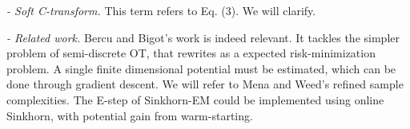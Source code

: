 \documentclass{article}
\begin{document}
\textit{- Soft C-transform.} This term refers to Eq. (3). We will clarify.

\textit{- Related work.} Bercu and Bigot's work is indeed relevant. It tackles the simpler problem of semi-discrete OT, that rewrites as a expected risk-minimization problem. A single finite dimensional potential must be estimated, which can be done through gradient descent. We will refer to Mena and Weed's refined sample complexities. The E-step of Sinkhorn-EM could be implemented using online Sinkhorn, with potential gain from warm-starting.
\end{document}
